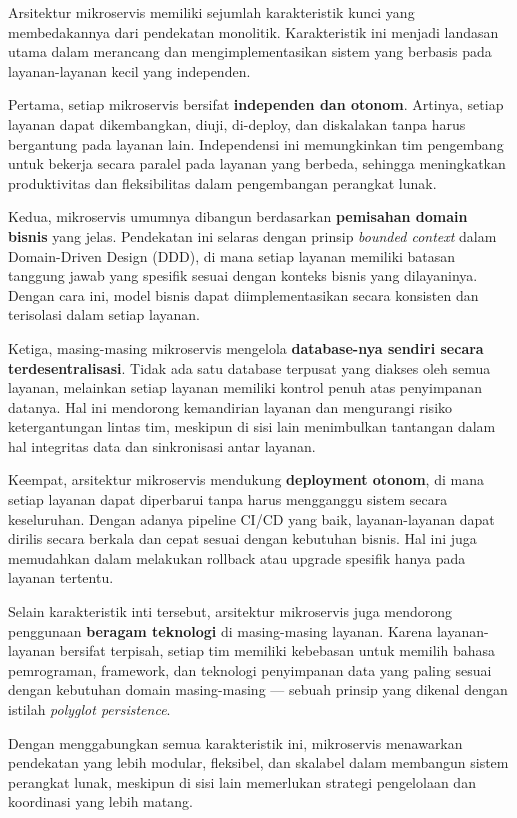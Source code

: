 Arsitektur mikroservis memiliki sejumlah karakteristik kunci yang membedakannya dari pendekatan monolitik. Karakteristik ini menjadi landasan utama dalam merancang dan mengimplementasikan sistem yang berbasis pada layanan-layanan kecil yang independen.

Pertama, setiap mikroservis bersifat \textbf{independen dan otonom}. Artinya, setiap layanan dapat dikembangkan, diuji, di-deploy, dan diskalakan tanpa harus bergantung pada layanan lain. Independensi ini memungkinkan tim pengembang untuk bekerja secara paralel pada layanan yang berbeda, sehingga meningkatkan produktivitas dan fleksibilitas dalam pengembangan perangkat lunak.

Kedua, mikroservis umumnya dibangun berdasarkan \textbf{pemisahan domain bisnis} yang jelas. Pendekatan ini selaras dengan prinsip \textit{bounded context} dalam Domain-Driven Design (DDD), di mana setiap layanan memiliki batasan tanggung jawab yang spesifik sesuai dengan konteks bisnis yang dilayaninya. Dengan cara ini, model bisnis dapat diimplementasikan secara konsisten dan terisolasi dalam setiap layanan.

Ketiga, masing-masing mikroservis mengelola \textbf{database-nya sendiri secara terdesentralisasi}. Tidak ada satu database terpusat yang diakses oleh semua layanan, melainkan setiap layanan memiliki kontrol penuh atas penyimpanan datanya. Hal ini mendorong kemandirian layanan dan mengurangi risiko ketergantungan lintas tim, meskipun di sisi lain menimbulkan tantangan dalam hal integritas data dan sinkronisasi antar layanan.

Keempat, arsitektur mikroservis mendukung \textbf{deployment otonom}, di mana setiap layanan dapat diperbarui tanpa harus mengganggu sistem secara keseluruhan. Dengan adanya pipeline CI/CD yang baik, layanan-layanan dapat dirilis secara berkala dan cepat sesuai dengan kebutuhan bisnis. Hal ini juga memudahkan dalam melakukan rollback atau upgrade spesifik hanya pada layanan tertentu.

Selain karakteristik inti tersebut, arsitektur mikroservis juga mendorong penggunaan \textbf{beragam teknologi} di masing-masing layanan. Karena layanan-layanan bersifat terpisah, setiap tim memiliki kebebasan untuk memilih bahasa pemrograman, framework, dan teknologi penyimpanan data yang paling sesuai dengan kebutuhan domain masing-masing — sebuah prinsip yang dikenal dengan istilah \textit{polyglot persistence}.

Dengan menggabungkan semua karakteristik ini, mikroservis menawarkan pendekatan yang lebih modular, fleksibel, dan skalabel dalam membangun sistem perangkat lunak, meskipun di sisi lain memerlukan strategi pengelolaan dan koordinasi yang lebih matang.

